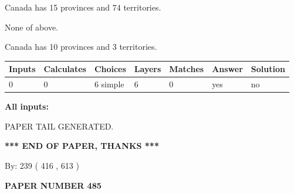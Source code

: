\documentclass[12pt]{article}
\begin{document}
 
Canada has  15 provinces and  74 territories.
 
 
 None of above.
 
 
\noindent{}
 
 
Canada has 10  provinces and 3 territories.
 
 
\noindent{}
 
 
   
   
   
   
\noindent\begin{tabular}{|l|l|l|l|l|l|l|}
 \hline
Inputs & Calculates & Choices & Layers & Matches & Answer & Solution \\ \hline
 0  & 
 0  & 
 6
  simple  
  & 
 6  & 
 0  & 
  yes & 
  no 
  \\ \hline
 \end{tabular}
   
   
   
   
\noindent{}
   
   
   
   
\noindent\vspace{0.1in}\hspace{-0.08in} {\textbf{\Large{All inputs: }}}
   
   
   
   
   
   
 \vspace{0.2in}
 
   
   
\vspace{2.0in} PAPER TAIL GENERATED.
   
   
   
   
\vspace{1.0in} 
{\textbf{\large{ *** END OF PAPER, THANKS *** }}} 
   
   
\hspace{1.0in} By: 
 239 ( 416 ,  613 )
   
   
   
   
\newpage 
\setcounter{page}{ 
   485001 } 
   
   
   
   
 {\textbf{ \Large{ PAPER NUMBER  485  }}}
   
\end{document}
